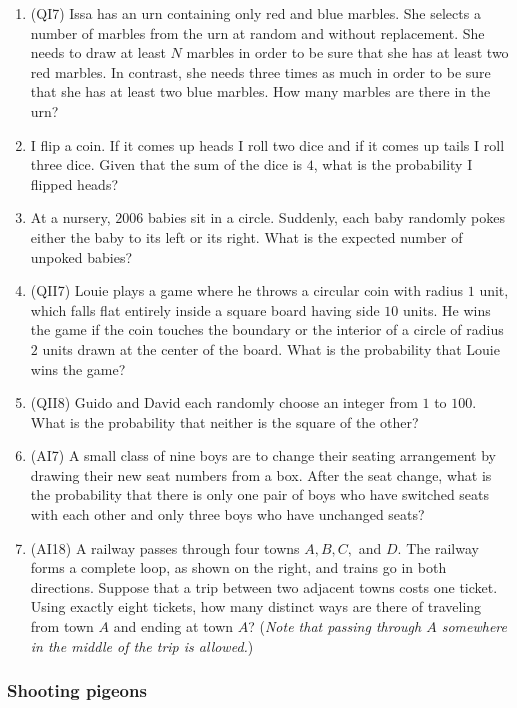 \documentclass[10pt,paper=letter]{scrartcl}
\begin{document}
\begin{enumerate}
  \item (QI7) Issa has an urn containing only red and blue marbles. She selects a number of marbles from the urn at random and without replacement. She needs to draw at least $N$ marbles in order to be sure that she has at least two red marbles. In contrast, she needs three times as much in order to be sure that she has at least two blue marbles. How many marbles are there in the urn?
  \item I flip a coin. If it comes up heads I roll two dice and if it comes up tails I roll three dice. Given that the sum of the dice is $4$, what is the probability I flipped heads?
  \item At a nursery, $2006$ babies sit in a circle. Suddenly, each baby randomly pokes either the baby to its left or its right. What is the expected number of unpoked babies?
  \item (QII7) Louie plays a game where he throws a circular coin with radius $1$ unit, which falls flat entirely inside a square board having side $10$ units. He wins the game if the coin touches the boundary or the interior of a circle of radius $2$ units drawn at the center of the board. What is the probability that Louie wins the game?
  \item (QII8) Guido and David each randomly choose an integer from $1$ to $100$. What is the probability that neither is the square of the other?
  \item (AI7) A small class of nine boys are to change their seating arrangement by drawing their new seat numbers from a box. After the seat change, what is the probability that there is only one pair of boys who have switched seats with each other and only three boys who have unchanged seats?
  \item (AI18) A railway passes through four towns $A, B, C,$ and $D$. The railway forms a complete loop, as shown on the right, and trains go in both directions. Suppose that a trip between two adjacent towns costs one ticket. Using exactly eight tickets, how many distinct ways are there of traveling from town $A$ and ending at town $A$? (\emph{Note that passing through $A$ somewhere in the middle of the trip is allowed.})
\end{enumerate}

\subsubsection*{Shooting pigeons}
\end{document}
